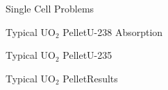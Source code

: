 \documentclass[sans,mathserif,aspectratio=169]{beamer}
\begin{document}
\begin{frame}{Single Cell Problems}
  \centering
\end{frame}

\begin{frame}{Typical UO$_2$ Pellet}{U-238 Absorption}
  \centering
\end{frame}

\begin{frame}{Typical UO$_2$ Pellet}{U-235}
  \centering
\end{frame}

\begin{frame}{Typical UO$_2$ Pellet}{Results}
  \centering
\end{frame}
\end{document}
